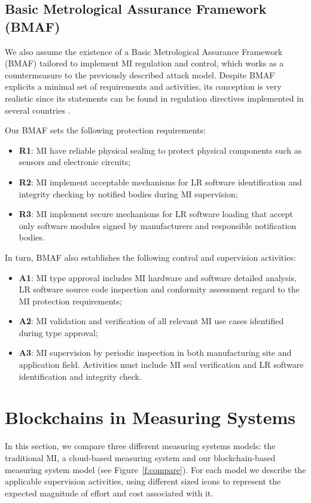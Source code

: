 \documentclass[journal]{IEEEtran}
\begin{document}
\subsection{Basic Metrological Assurance Framework (BMAF)}
We also assume the existence of a Basic Metrological Assurance Framework (BMAF) tailored to implement MI regulation and control, which works as a countermeasure to the  previously described attack model. Despite BMAF explicits a minimal set of requirements and activities, its conception is very realistic since its statements can be found in regulation directives implemented in several countries \cite{Esche2015,Camara2012,Boccardo2014,Luchsinger2008}.

Our BMAF sets the following protection requirements:
\begin{itemize}
 \item \textbf{R1}: MI have reliable physical sealing to protect physical components such as sensors and electronic circuits;
 \item \textbf{R2}: MI implement acceptable mechanisms for LR software identification and integrity checking by notified bodies during MI supervision;
 \item \textbf{R3}: MI implement secure mechanisms for LR software loading that accept only software modules signed by manufacturers and responsible notification bodies.
\end{itemize}

In turn, BMAF also establishes the following control and supervision activities:
\begin{itemize}
 \item \textbf{A1}: MI type approval includes MI hardware and software detailed analysis, LR software source code inspection and conformity assessment regard to the MI protection requirements;
 \item \textbf{A2}: MI validation and verification of all relevant MI use cases identified during type approval;
 \item \textbf{A3}: MI supervision by periodic inspection in both manufacturing site and application field. Activities must include MI seal verification and LR software identification and integrity check.
\end{itemize}

\section{Blockchains in Measuring Systems}
In this section, we compare three different measuring systems models: the traditional MI, a cloud-based measuring system and our blockchain-based measuring system model (see Figure~\ref{f:compare}). For each model we describe the applicable supervision activities, using different sized icons to represent the expected magnitude of effort and cost associated with it.
\end{document}
